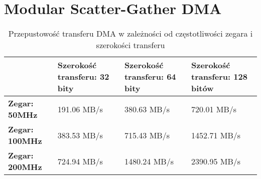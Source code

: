 \chapter{Modular Scatter-Gather DMA}

\begin{table}[h]
    \centering
    \begin{tabular}{|l|p{3.5cm}|p{3.5cm}|p{3.5cm}|}
    \hline
     & \textbf{Szerokość transferu: 32 bity} & \textbf{Szerokość transferu: 64 bity} & \textbf{Szerokość transferu: 128 bitów} \\ \hline
    \textbf{Zegar: 50MHz} & {191.06 MB/s} & {380.63 MB/s} & {720.01 MB/s} \\ \hline
    \textbf{Zegar: 100MHz} & {383.53 MB/s} & {715.43 MB/s} & {1452.71 MB/s} \\ \hline
    \textbf{Zegar: 200MHz} & {724.94 MB/s} & {1480.24 MB/s}  & {2390.95 MB/s} \\ \hline
    \end{tabular}
    \caption{Przepustowość transferu DMA w zależności od częstotliwości zegara i szerokości transferu}
    \label{tab:my_label}
    \end{table}